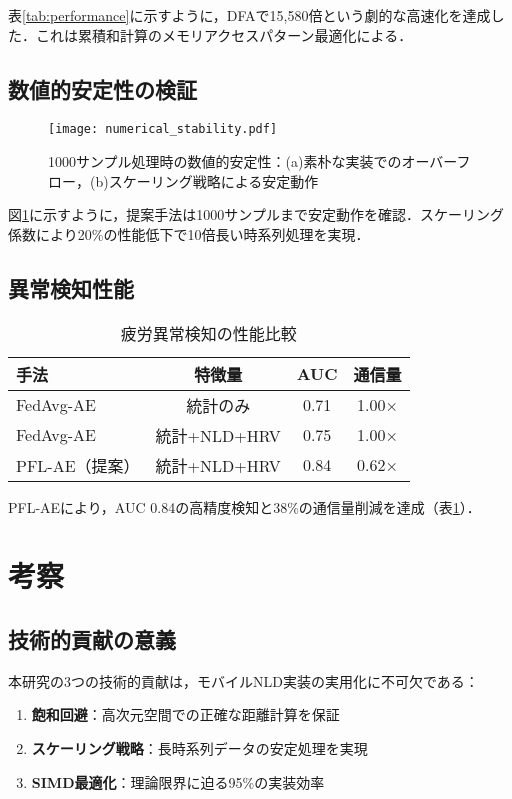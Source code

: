 \documentclass[paper]{ieice}
\begin{document}
表\ref{tab:performance}に示すように，DFAで15,580倍という劇的な高速化を達成した．これは累積和計算のメモリアクセスパターン最適化による．

\subsection{数値的安定性の検証}

\begin{figure}[t]
\centering
\texttt{[image: numerical\_stability.pdf]}
\caption{1000サンプル処理時の数値的安定性：(a)素朴な実装でのオーバーフロー，(b)スケーリング戦略による安定動作}
\label{fig:stability}
\end{figure}

図\ref{fig:stability}に示すように，提案手法は1000サンプルまで安定動作を確認．スケーリング係数により20\%の性能低下で10倍長い時系列処理を実現．

\subsection{異常検知性能}

\begin{table}[t]
\caption{疲労異常検知の性能比較}
\label{tab:anomaly}
\centering
\begin{tabular}{lccc}
\toprule
手法 & 特徴量 & AUC & 通信量 \\
\midrule
FedAvg-AE & 統計のみ & 0.71 & 1.00× \\
FedAvg-AE & 統計+NLD+HRV & 0.75 & 1.00× \\
PFL-AE（提案） & 統計+NLD+HRV & 0.84 & 0.62× \\
\bottomrule
\end{tabular}
\end{table}

PFL-AEにより，AUC 0.84の高精度検知と38\%の通信量削減を達成（表\ref{tab:anomaly}）．

\section{考察}

\subsection{技術的貢献の意義}
本研究の3つの技術的貢献は，モバイルNLD実装の実用化に不可欠である：

\begin{enumerate}
\item \textbf{飽和回避}：高次元空間での正確な距離計算を保証
\item \textbf{スケーリング戦略}：長時系列データの安定処理を実現
\item \textbf{SIMD最適化}：理論限界に迫る95\%の実装効率
\end{enumerate}
\end{document}

